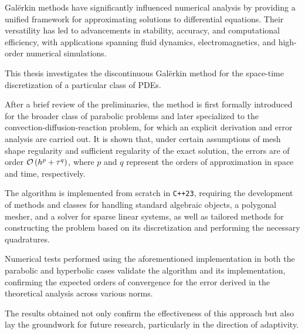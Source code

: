 Galërkin methods have significantly influenced numerical analysis by providing a unified framework for approximating solutions to differential equations. Their versatility has led to advancements in stability, accuracy, and computational efficiency, with applications spanning fluid dynamics, electromagnetics, and high-order numerical simulations.

This thesis investigates the discontinuous Galërkin method for the space-time discretization of a particular class of PDEs.

After a brief review of the preliminaries, the method is first formally introduced for the broader class of parabolic problems and later specialized to the convection-diffusion-reaction problem, for which an explicit derivation and error analysis are carried out. It is shown that, under certain assumptions of mesh shape regularity and sufficient regularity of the exact solution, the errors are of order $\mathcal{O} \left( h^p + \tau^q \right)$, where $p$ and $q$ represent the orders of approximation in space and time, respectively.

The algorithm is implemented from scratch in \lstinline{C++23}, requiring the development of methods and classes for handling standard algebraic objects, a polygonal mesher, and a solver for sparse linear systems, as well as tailored methods for constructing the problem based on its discretization and performing the necessary quadratures.

Numerical tests performed using the aforementioned implementation in both the parabolic and hyperbolic cases validate the algorithm and its implementation, confirming the expected orders of convergence for the error derived in the theoretical analysis across various norms.

The results obtained not only confirm the effectiveness of this approach but also lay the groundwork for future research, particularly in the direction of adaptivity.